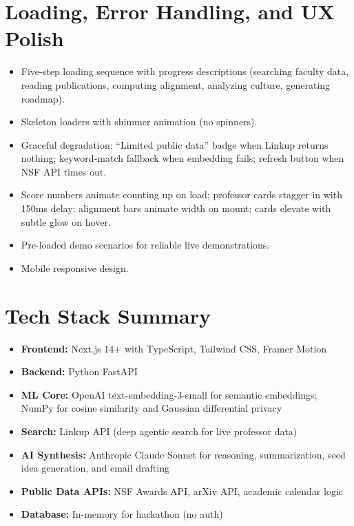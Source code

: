 \documentclass{article}
\begin{document}
\section{Loading, Error Handling, and UX Polish}

\begin{itemize}
  \item Five-step loading sequence with progress descriptions (searching faculty
        data, reading publications, computing alignment, analyzing culture,
        generating roadmap).
  \item Skeleton loaders with shimmer animation (no spinners).
  \item Graceful degradation: ``Limited public data'' badge when Linkup returns
        nothing; keyword-match fallback when embedding fails; refresh button
        when NSF API times out.
  \item Score numbers animate counting up on load; professor cards stagger
        in with 150ms delay; alignment bars animate width on mount; cards
        elevate with subtle glow on hover.
  \item Pre-loaded demo scenarios for reliable live demonstrations.
  \item Mobile responsive design.
\end{itemize}

\section{Tech Stack Summary}

\begin{itemize}
  \item \textbf{Frontend:} Next.js 14+ with TypeScript, Tailwind CSS, Framer Motion
  \item \textbf{Backend:} Python FastAPI
  \item \textbf{ML Core:} OpenAI text-embedding-3-small for semantic embeddings;
        NumPy for cosine similarity and Gaussian differential privacy
  \item \textbf{Search:} Linkup API (deep agentic search for live professor data)
  \item \textbf{AI Synthesis:} Anthropic Claude Sonnet for reasoning, summarization,
        seed idea generation, and email drafting
  \item \textbf{Public Data APIs:} NSF Awards API, arXiv API, academic calendar logic
  \item \textbf{Database:} In-memory for hackathon (no auth)
\end{itemize}
\end{document}
